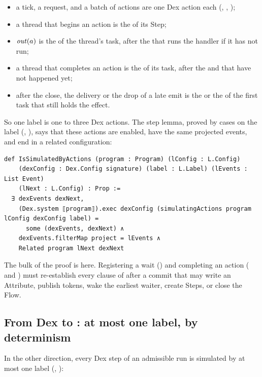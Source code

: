 \begin{itemize}
\item a tick, a request, and a batch of  actions are one Dex action
  each (, , );
\item a thread that begins an action is the  of its
  Step;
\item $\mathit{out}(a)$ is the  of the thread's task, after
  the  that runs the handler if it has not run;
\item a thread that completes an action is the  of its
  task, after the  and  that have not
  happened yet;
\item after the close, the delivery or the drop of a late emit is the
   or the  of the first task that
  still holds the effect.
\end{itemize}
So one \Lang{} label is one to three Dex actions. The step lemma, proved by
cases on the label (,
), says that these actions are enabled, have
the same projected events, and end in a related configuration:

\begin{Verbatim}
def IsSimulatedByActions (program : Program) (lConfig : L.Config)
    (dexConfig : Dex.Config signature) (label : L.Label) (lEvents : List Event)
    (lNext : L.Config) : Prop :=
  ∃ dexEvents dexNext,
    (Dex.system ⟦program⟧).exec dexConfig (simulatingActions program lConfig dexConfig label) =
      some (dexEvents, dexNext) ∧
    dexEvents.filterMap project = lEvents ∧
    Related program lNext dexNext
\end{Verbatim}

The bulk of the proof is here. Registering a wait
() and completing an action
( and ) must
re-establish every clause of  after a commit that may write
an Attribute, publish tokens, wake the earliest waiter, create Steps, or
close the Flow.

\subsection{From Dex to \Lang{}: at most one label, by determinism}
\label{sec:dextol}

In the other direction, every Dex step of an admissible run is simulated by
at most one \Lang{} label (,
):

